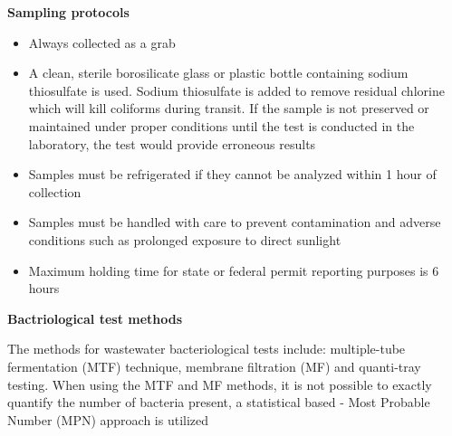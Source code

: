\vspace{0.5cm}
\textbf{Sampling protocols}
\begin{itemize}
\item Always collected as a grab
\item A clean, sterile borosilicate glass or plastic bottle containing sodium thiosulfate is used. Sodium thiosulfate is added to remove residual chlorine which will kill coliforms during transit. If the sample is not preserved or maintained under proper conditions until the test is conducted in the laboratory, the test would provide erroneous results
\item Samples must be refrigerated if they cannot be analyzed within 1 hour of collection
\item Samples must be handled with care to prevent contamination and adverse conditions such as prolonged exposure to direct sunlight
\item Maximum holding time for state or federal permit reporting purposes is 6 hours
\end{itemize}  
\vspace{0.5cm}
\textbf{Bactriological test methods}

The methods for wastewater bacteriological tests include:  multiple-tube fermentation (MTF) technique, membrane filtration (MF) and quanti-tray testing.  When using the MTF and MF methods, it is not possible to exactly quantify the number of bacteria present, a statistical based - Most Probable Number (MPN) approach is utilized\\


